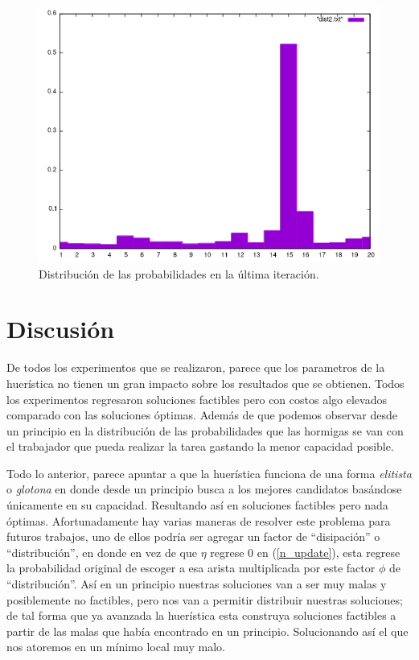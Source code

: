 \documentclass{article}
\newcommand{\tit}[1]{\textit{#1}}
\begin{document}
\begin{figure}[H]
      \begin{minipage}{\linewidth}
        \centering
        \includegraphics[scale=0.4]{dist2}
        \caption{ Distribución de las probabilidades en la última iteración. }
      \end{minipage}
    \end{figure}

    \section{Discusión} \label{discussion}
    De todos los experimentos que se realizaron, parece que 
    los parametros de la huerística no tienen un gran 
    impacto sobre los resultados que se obtienen. Todos los
    experimentos regresaron soluciones factibles pero 
    con costos algo elevados comparado con las soluciones 
    óptimas. Además de que podemos observar desde un principio
    en la distribución de las probabilidades que las hormigas 
    se van con el trabajador que pueda realizar la tarea 
    gastando la menor capacidad posible.

    Todo lo anterior, parece apuntar a que la huerística 
    funciona de una forma \tit{elitista} o \tit{glotona}
    en donde desde un principio busca a los mejores 
    candidatos basándose únicamente en su capacidad. 
    Resultando así en soluciones factibles pero nada 
    óptimas. Afortunadamente hay varias maneras de resolver
    este problema para futuros trabajos, uno de ellos
    podría ser agregar un factor de ``disipación''
    o ``distribución'', en donde en vez de que 
    $\eta$ regrese 0 en (\ref{n_update}), esta regrese la
    probabilidad original de escoger a esa arista
    multiplicada por este factor $\phi$ de ``distribución''.
    Así en un principio nuestras soluciones van a ser muy 
    malas y posiblemente no factibles, pero nos van a 
    permitir distribuir nuestras soluciones; de tal 
    forma que ya avanzada la huerística esta construya 
    soluciones factibles a partir de las 
    malas que había encontrado en un principio. 
    Solucionando así el que nos atoremos 
    en un mínimo local muy malo.
\end{document}
